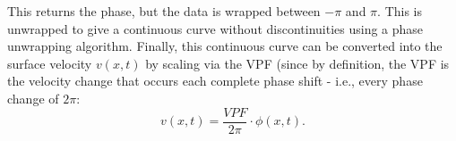 This returns the phase, but the data is wrapped between $-\pi$ and $\pi$. This is unwrapped to give a continuous curve without discontinuities using a phase unwrapping algorithm. Finally, this continuous curve can be converted into the surface velocity $v(x,t)$ by scaling via the VPF (since by definition, the VPF is the velocity change that occurs each complete phase shift - i.e., every phase change of $2\pi$:
\begin{equation} v(x,t) = \frac{VPF}{2\pi} \cdot \phi(x,t). \end{equation}
